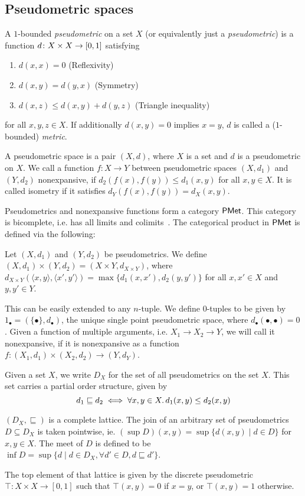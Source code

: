 \subsection{Pseudometric spaces}\label{c2:subsec:pseudometric_spaces}
A $1$-bounded \emph{pseudometric} on a set $X$ (or equivalently just a \emph{pseudometric}) is a function $d \colon X \times X \to \interval{0}{1}$ satisfying
\begin{enumerate}
	\item  $d(x,x)=0$ (Reflexivity)
	\item  $d(x,y)=d(y,x)$ ({Symmetry})
	\item  $d(x,z) \leq d(x, y) + d(y,z)$ (Triangle inequality)
\end{enumerate}
for all $x,y,z \in X$. If additionally $d(x,y)=0$ implies $x=y$, $d$ is called a ($1$-bounded) \emph{metric}. 
\begin{definition}
	A pseudometric space is a pair $(X, d)$, where $X$ is a set and $d$ is a pseudometric on $X$. We call a function $f \colon X \to Y$ between pseudometric spaces $(X,d_1)$ and $(Y,d_2)$ nonexpansive, if $d_2(f(x),f(y))\leq d_1(x,y)$ for all $x,y \in X$. It is called isometry if it satisfies $d_Y(f(x),f(y))=d_X(x,y)$. 	
\end{definition}
Pseudometrics and nonexpansive functions form a category $\mathsf{PMet}$. This category is bicomplete, i.e. has all limits and colimits~\cite[Theorem~3.8]{Baldan:2018:Coalgebraic}. The categorical product in $\mathsf{PMet}$ is defined via the following:
\begin{definition}
Let $(X,d_1)$ and $(Y, d_2)$ be pseudometrics. We define $(X, d_1) \times (Y, d_2) = (X \times Y, d_{X \times Y})$, where $d_{X \times Y}(\langle x,y \rangle,\langle x',y' \rangle ) = \max \{d_1(x,x'), d_2(y,y')\}$ for all $x,x' \in X$ and $y,y' \in Y$.
\end{definition}
This can be easily extended to any $n$-tuple. We define $0$-tuples to be given by $1_{\bullet} = (\{\bullet\}, d_{\bullet})$, the unique single point pseudometric space, where $d_{\bullet}(\bullet,\bullet)=0$. Given a function of multiple arguments, i.e. $X_1 \to X_2 \to Y$, we will call it nonexpansive, if it is nonexpansive as a function $f \colon (X_1, d_{1}) \times (X_2, d_{2}) \to (Y, d_Y)$. 	


Given a set $X$, we write $D_X$ for the set of all pseudometrics on the set $X$. This set carries a partial order structure, given by
$$d_1 \sqsubseteq d_2 \iff \forall x,y \in X \ldotp d_1(x,y) \leq d_2(x,y)$$  
\begin{lemma}\label{c2:lem:pseudometrics_complete_lattice}
    $(D_X, \sqsubseteq )$ is a complete lattice. The join of an arbitrary set of pseudometrics $D \subseteq D_X$ is taken pointwise, ie. $\left(\sup D \right)(x,y) = \sup \{ d(x,y) \mid d \in D\}$ for $x, y \in X$. The meet of $D$ is defined to be $\inf D = \sup \{ d \mid d \in D_X , \forall {d' \in D}, d \sqsubseteq d'\}$.
\end{lemma}
The top element of that lattice is given by the discrete pseudometric $\top \colon X \times X \to [0,1]$ such that $\top(x,y) = 0$ if $x=y$, or $\top(x,y)=1$ otherwise.

